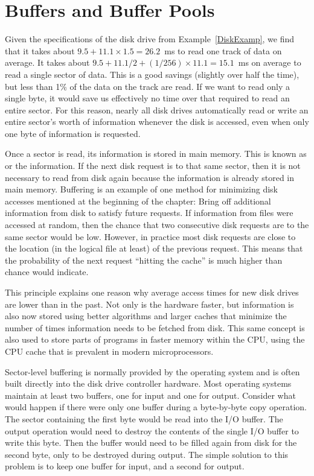 
\section{Buffers and Buffer Pools}
\label{BuffPool}

Given the specifications of the disk drive from
Example~\ref{DiskExamp}, we find that it takes about
\(9.5 + 11.1 \times 1.5 = 26.2\)~ms
to read one track of data on average.
It takes about
\(9.5 + 11.1/2 + (1/256)\times11.1 = 15.1\)~ms on average
to read a single sector of data.
This is a good savings (slightly over half the time), but
less than 1\% of the data on the track are read.
If we want to read only a single byte, it would save us effectively no
time over that required to read an entire sector.
For this reason, nearly all disk drives automatically read or write
an entire sector's worth of information whenever the disk is
accessed, even when only one byte of information is requested.

Once a sector is read, its information is stored in main memory.
This is known as  or  the
information.
If the next disk request is to that same sector, then
it is not necessary to read from disk again because the information is
already stored in main memory.
Buffering is an example of one method for minimizing disk
accesses mentioned at the beginning of the chapter:
Bring off additional information from disk to satisfy future
requests.
If information from files were accessed at random, then the
chance that two consecutive disk requests are to the same sector
would be low.
However, in practice most disk requests are close to the location
(in the logical file at least) of the previous
request.
This means that the probability of the next request ``hitting the
cache'' is much higher than chance would indicate.

This principle explains one reason why average access times for new
disk drives are lower than in the past.
Not only is the hardware faster, but information is also now stored
using better algorithms and larger caches that minimize the number
of times information needs to be fetched from disk.
This same concept is also used to store parts of programs in faster
memory within the CPU, using the CPU cache that is
prevalent in modern microprocessors.

Sector-level buffering is normally provided by the
operating system
and is often built directly into the disk drive controller hardware.
Most operating systems maintain at least two buffers,
one for input and one for output.
Consider what would happen if there were only one buffer during a
byte-by-byte copy operation.
The sector containing the first byte would be read into the I/O
buffer.
The output operation would need to destroy the contents of the single
I/O buffer to write this byte.
Then the buffer would need to be filled again from disk for the
second byte, only to be destroyed during output.
The simple solution to this problem is to keep one buffer for input,
and a second for output.

